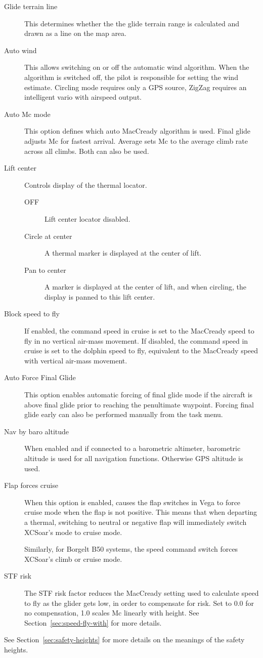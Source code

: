 \documentclass[a4paper,12pt]{refrep}
\begin{document}
\begin{description}
\item[Glide terrain line]  This determines whether the the
glide terrain range is calculated and drawn as a line on the map area.
\item[Auto wind] This allows switching on or off the automatic wind algorithm.
  When the algorithm is switched off, the pilot is responsible for
  setting the wind estimate. Circling mode requires only a GPS source, 
  ZigZag requires an intelligent vario with airspeed output.
\item[Auto Mc mode] This option defines which auto MacCready algorithm is used.
Final glide adjusts Mc for fastest arrival.  Average sets Mc to the average climb rate across all climbs.  Both can also be used.
\item[Lift center]  Controls display of the thermal locator.
\begin{description}
\item[OFF] Lift center locator disabled.
\item[Circle at center]  A thermal marker is displayed at the center of lift.
\item[Pan to center] A marker is displayed at the center of lift, 
 and when circling, the display is panned to this lift center.
\end{description}
\item[Block speed to fly] If enabled, the command speed in cruise
  is set to the MacCready speed to fly in no vertical air-mass movement.
  If disabled, the command speed in cruise is set to the dolphin speed to fly,
  equivalent to the MacCready speed with vertical air-mass movement.
\item[Auto Force Final Glide] This option enables automatic forcing of final
 glide mode if the aircraft is above final glide prior to reaching the
 penultimate waypoint. Forcing final glide early can also be performed manually
 from the task menu.
\item[Nav by baro altitude] When enabled and if connected to a barometric
  altimeter, barometric altitude is used for all navigation functions. Otherwise
  GPS altitude is used.
\item[Flap forces cruise]
  When this option is enabled, causes the flap switches in Vega to
  force cruise mode when the flap is not positive.  This means that
  when departing a thermal, switching to neutral or negative flap will
  immediately switch XCSoar's mode to cruise mode.

  Similarly, for Borgelt B50 systems, the speed command switch forces
  XCSoar's climb or cruise mode.

\item[STF risk] 
  The STF risk factor reduces the MacCready setting used to calculate
  speed to fly as the glider gets low, in order to compensate for
  risk.  Set to 0.0 for no compensation, 1.0 scales Mc linearly with
  height.  See Section~\ref{sec:speed-fly-with} for more details.
\end{description}
See Section~\ref{sec:safety-heights} for more details on the meanings
of the safety heights.
\end{document}

